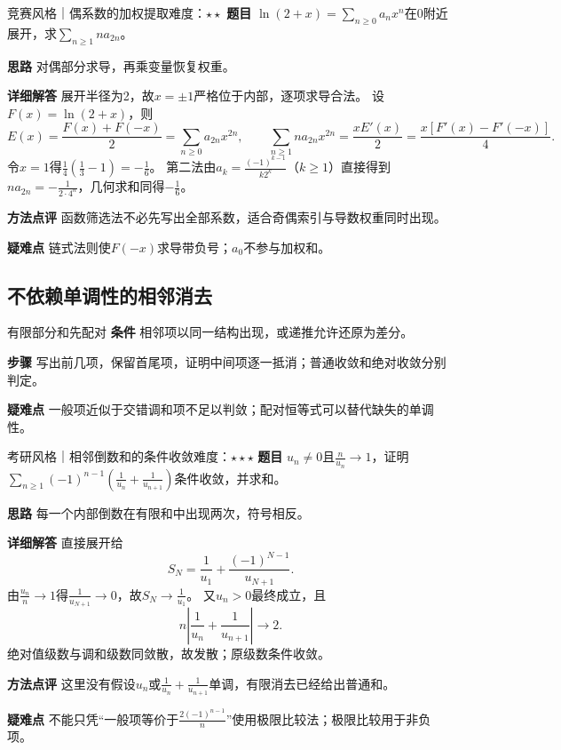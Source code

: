 \begin{example}{竞赛风格｜偶系数的加权提取}{难度：$\star\star$}\label{cse:ex:even}
\textbf{题目} $\ln(2+x)=\sum_{n\ge0}a_nx^n$在0附近展开，求$\sum_{n\ge1}n a_{2n}$。
\par\textbf{思路} 对偶部分求导，再乘变量恢复权重。
\par\textbf{详细解答} 展开半径为2，故$x=\pm1$严格位于内部，逐项求导合法。
设$F(x)=\ln(2+x)$，则
\[
E(x)=\dfrac{F(x)+F(-x)}2=\sum_{n\ge0}a_{2n}x^{2n},
\qquad
\sum_{n\ge1}na_{2n}x^{2n}=\dfrac{xE'(x)}2
=\dfrac{x[F'(x)-F'(-x)]}{4}.
\]
令$x=1$得$\frac14(\frac{1}{3}-1)=-\frac{1}{6}$。
第二法由$a_k=\frac{(-1)^{k-1}}{k2^k}$（$k\ge1$）直接得到$na_{2n}=-\frac{1}{2\cdot4^n}$，几何求和同得$-\frac{1}{6}$。
\par\textbf{方法点评} 函数筛选法不必先写出全部系数，适合奇偶索引与导数权重同时出现。
\par\textbf{疑难点} 链式法则使$F(-x)$求导带负号；$a_0$不参与加权和。
\end{example}

\subsection{不依赖单调性的相邻消去}\label{cse:pair}
\begin{method}{有限部分和先配对}
\textbf{条件} 相邻项以同一结构出现，或递推允许还原为差分。
\par\textbf{步骤} 写出前几项，保留首尾项，证明中间项逐一抵消；普通收敛和绝对收敛分别判定。
\par\textbf{疑难点} 一般项近似于交错调和项不足以判敛；配对恒等式可以替代缺失的单调性。
\end{method}
\begin{example}{考研风格｜相邻倒数和的条件收敛}{难度：$\star\star\star$}\label{cse:ex:paired}
\textbf{题目} $u_n\ne0$且$\frac{n}{u_n}\to1$，证明
$\sum_{n\ge1}(-1)^{n-1}(\frac{1}{u_n}+\frac{1}{u_{n+1}})$条件收敛，并求和。
\par\textbf{思路} 每一个内部倒数在有限和中出现两次，符号相反。
\par\textbf{详细解答} 直接展开给
\[
S_N=\dfrac1{u_1}+\dfrac{(-1)^{N-1}}{u_{N+1}}.
\]
由$\frac{u_n}{n}\to1$得$\frac{1}{u_{N+1}}\to0$，故$S_N\to\frac{1}{u_1}$。
又$u_n>0$最终成立，且
\[
n\left|\dfrac1{u_n}+\dfrac1{u_{n+1}}\right|\longrightarrow2.
\]
绝对值级数与调和级数同敛散，故发散；原级数条件收敛。
\par\textbf{方法点评} 这里没有假设$u_n$或$\frac{1}{u_n}+\frac{1}{u_{n+1}}$单调，有限消去已经给出普通和。
\par\textbf{疑难点} 不能只凭“一般项等价于$\frac{2(-1)^{n-1}}{n}$”使用极限比较法；极限比较用于非负项。
\end{example}

